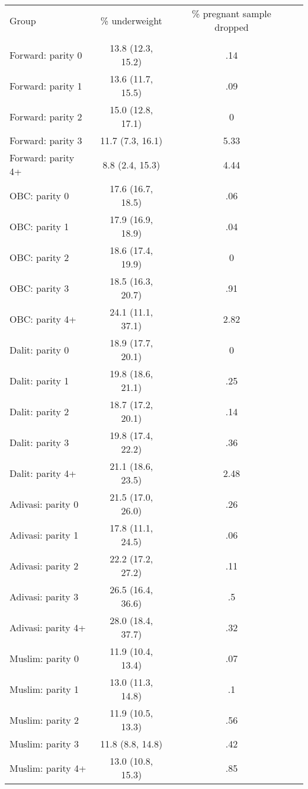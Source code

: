 \begin{tabular}{lccc}
\toprule
Group & \% underweight & \% pregnant sample dropped \\\\
\midrule
Forward: parity 0&13.8 (12.3, 15.2)&.14\\
Forward: parity 1&13.6 (11.7, 15.5)&.09\\
Forward: parity 2&15.0 (12.8, 17.1)&0\\
Forward: parity 3&11.7 (7.3, 16.1)&5.33\\
Forward: parity 4+&8.8 (2.4, 15.3)&4.44\\
OBC: parity 0&17.6 (16.7, 18.5)&.06\\
OBC: parity 1&17.9 (16.9, 18.9)&.04\\
OBC: parity 2&18.6 (17.4, 19.9)&0\\
OBC: parity 3&18.5 (16.3, 20.7)&.91\\
OBC: parity 4+&24.1 (11.1, 37.1)&2.82\\
Dalit: parity 0&18.9 (17.7, 20.1)&0\\
Dalit: parity 1&19.8 (18.6, 21.1)&.25\\
Dalit: parity 2&18.7 (17.2, 20.1)&.14\\
Dalit: parity 3&19.8 (17.4, 22.2)&.36\\
Dalit: parity 4+&21.1 (18.6, 23.5)&2.48\\
Adivasi: parity 0&21.5 (17.0, 26.0)&.26\\
Adivasi: parity 1&17.8 (11.1, 24.5)&.06\\
Adivasi: parity 2&22.2 (17.2, 27.2)&.11\\
Adivasi: parity 3&26.5 (16.4, 36.6)&.5\\
Adivasi: parity 4+&28.0 (18.4, 37.7)&.32\\
Muslim: parity 0&11.9 (10.4, 13.4)&.07\\
Muslim: parity 1&13.0 (11.3, 14.8)&.1\\
Muslim: parity 2&11.9 (10.5, 13.3)&.56\\
Muslim: parity 3&11.8 (8.8, 14.8)&.42\\
Muslim: parity 4+&13.0 (10.8, 15.3)&.85\\
\bottomrule
\end{tabular}
